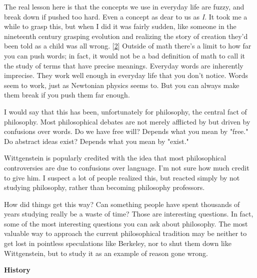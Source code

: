 The real lesson here is that the
                  concepts we use in everyday life are fuzzy, and break down if
                  pushed too hard. Even a concept as dear to us as \emph{I}. It
                  took me a while to grasp this, but when I did it was fairly
                  sudden, like someone in the nineteenth century grasping
                  evolution and realizing the story of creation they'd been told
                  as a child was all wrong.
                  [\href{\#f2n}{2}]
                  Outside of math there's a limit to how far you can push words;
                  in fact, it would not be a bad definition of math to call it
                  the study of terms that have precise meanings. Everyday words
                  are inherently imprecise. They work well enough in everyday
                  life that you don't notice. Words seem to work, just as
                  Newtonian physics seems to. But you can always make them break
                  if you push them far enough.

I would say that this
                  has been, unfortunately for philosophy, the central fact of
                  philosophy. Most philosophical debates are not merely
                  afflicted by but driven by confusions over words. Do we have
                  free will? Depends what you mean by "free." Do abstract ideas
                  exist? Depends what you mean by "exist."

Wittgenstein
                  is popularly credited with the idea that most philosophical
                  controversies are due to confusions over language. I'm not
                  sure how much credit to give him. I suspect a lot of people
                  realized this, but reacted simply by not studying philosophy,
                  rather than becoming philosophy professors.

How did
                  things get this way? Can something people have spent thousands
                  of years studying really be a waste of time? Those are
                  interesting questions. In fact, some of the most interesting
                  questions you can ask about philosophy. The most valuable way
                  to approach the current philosophical tradition may be neither
                  to get lost in pointless speculations like Berkeley, nor to
                  shut them down like Wittgenstein, but to study it as an
                  example of reason gone wrong.

\textbf{History}

